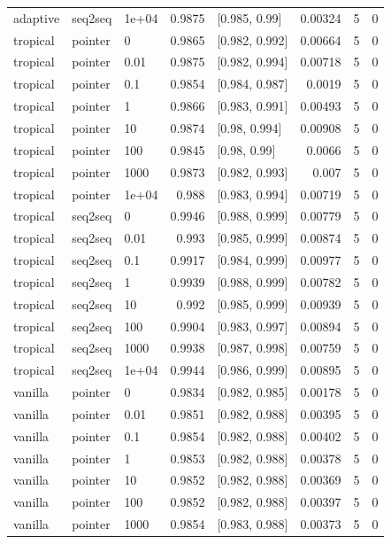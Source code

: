\documentclass[10pt]{article}
\begin{document}
{\begin{longtable}{lllrlrrr}
adaptive & seq2seq & 1e+04 & 0.9875 & [0.985, 0.99] & 0.00324 & 5 & 0\\
tropical & pointer & 0 & 0.9865 & [0.982, 0.992] & 0.00664 & 5 & 0\\
tropical & pointer & 0.01 & 0.9875 & [0.982, 0.994] & 0.00718 & 5 & 0\\
tropical & pointer & 0.1 & 0.9854 & [0.984, 0.987] & 0.0019 & 5 & 0\\
tropical & pointer & 1 & 0.9866 & [0.983, 0.991] & 0.00493 & 5 & 0\\
tropical & pointer & 10 & 0.9874 & [0.98, 0.994] & 0.00908 & 5 & 0\\
tropical & pointer & 100 & 0.9845 & [0.98, 0.99] & 0.0066 & 5 & 0\\
tropical & pointer & 1000 & 0.9873 & [0.982, 0.993] & 0.007 & 5 & 0\\
tropical & pointer & 1e+04 & 0.988 & [0.983, 0.994] & 0.00719 & 5 & 0\\
tropical & seq2seq & 0 & 0.9946 & [0.988, 0.999] & 0.00779 & 5 & 0\\
tropical & seq2seq & 0.01 & 0.993 & [0.985, 0.999] & 0.00874 & 5 & 0\\
tropical & seq2seq & 0.1 & 0.9917 & [0.984, 0.999] & 0.00977 & 5 & 0\\
tropical & seq2seq & 1 & 0.9939 & [0.988, 0.999] & 0.00782 & 5 & 0\\
tropical & seq2seq & 10 & 0.992 & [0.985, 0.999] & 0.00939 & 5 & 0\\
tropical & seq2seq & 100 & 0.9904 & [0.983, 0.997] & 0.00894 & 5 & 0\\
tropical & seq2seq & 1000 & 0.9938 & [0.987, 0.998] & 0.00759 & 5 & 0\\
tropical & seq2seq & 1e+04 & 0.9944 & [0.986, 0.999] & 0.00895 & 5 & 0\\
vanilla & pointer & 0 & 0.9834 & [0.982, 0.985] & 0.00178 & 5 & 0\\
vanilla & pointer & 0.01 & 0.9851 & [0.982, 0.988] & 0.00395 & 5 & 0\\
vanilla & pointer & 0.1 & 0.9854 & [0.982, 0.988] & 0.00402 & 5 & 0\\
vanilla & pointer & 1 & 0.9853 & [0.982, 0.988] & 0.00378 & 5 & 0\\
vanilla & pointer & 10 & 0.9852 & [0.982, 0.988] & 0.00369 & 5 & 0\\
vanilla & pointer & 100 & 0.9852 & [0.982, 0.988] & 0.00397 & 5 & 0\\
vanilla & pointer & 1000 & 0.9854 & [0.983, 0.988] & 0.00373 & 5 & 0\\

\end{longtable}}
\end{document}
